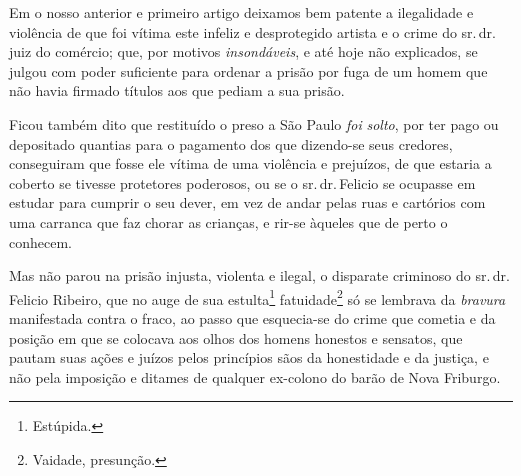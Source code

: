 Em o nosso anterior e primeiro artigo deixamos bem patente a ilegalidade
e violência de que foi vítima este infeliz e desprotegido artista e o
crime do sr.\,dr.\,juiz do comércio; que, por motivos \emph{insondáveis},
e até hoje não explicados, se julgou com poder suficiente para ordenar a
prisão por fuga de um homem que não havia firmado títulos aos que pediam
a sua prisão.

Ficou também dito que restituído o preso a São Paulo \emph{foi}
\emph{solto}, por ter pago ou depositado quantias para o pagamento dos
que dizendo-se seus credores, conseguiram que fosse ele vítima de uma
violência e prejuízos, de que estaria a coberto se tivesse protetores
poderosos, ou se o sr.\,dr.\,Felicio se ocupasse em estudar para cumprir o
seu dever, em vez de andar pelas ruas e cartórios com uma carranca que
faz chorar as crianças, e rir-se àqueles que de perto o conhecem.

Mas não parou na prisão injusta, violenta e ilegal, o disparate
criminoso do sr.\,dr.\,Felicio Ribeiro, que no auge de sua
estulta\footnote{ Estúpida.} fatuidade\footnote{ Vaidade, presunção.}
só se lembrava da \emph{bravura} manifestada contra o fraco, ao passo
que esquecia-se do crime que cometia e da posição em que se colocava aos
olhos dos homens honestos e sensatos, que pautam suas ações e juízos
pelos princípios sãos da honestidade e da justiça, e não pela imposição
e ditames de qualquer ex-colono do barão de Nova Friburgo.

